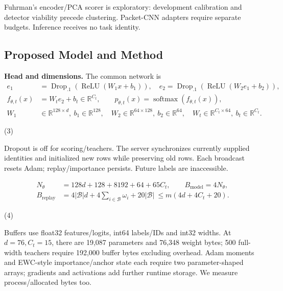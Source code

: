 \documentclass[10pt,a4paper]{article}
\begin{document}
Fuhrman's encoder/PCA scorer is exploratory: development calibration and detector viability precede clustering. Packet-CNN adapters require separate budgets. Inference receives no task identity.

\subsection{Proposed Model and Method}
\textbf{Head and dimensions.} The common network is
\begin{equation}
\begin{aligned}
e_1&=\operatorname{Drop}_{.1}(\operatorname{ReLU}(W_1x+b_1)),\quad
e_2=\operatorname{Drop}_{.1}(\operatorname{ReLU}(W_2e_1+b_2)),\\
f_{\theta,t}(x)&=W_te_2+b_t\in\mathbb R^{C_t},\qquad
p_{\theta,t}(x)=\operatorname{softmax}(f_{\theta,t}(x)),\\
W_1&\in\mathbb R^{128\times d},\ b_1\in\mathbb R^{128},\quad
W_2\in\mathbb R^{64\times128},\ b_2\in\mathbb R^{64},\quad
W_t\in\mathbb R^{C_t\times64},\ b_t\in\mathbb R^{C_t}.
\end{aligned}

\end{equation}
\par\hfill(3)\par

Dropout is off for scoring/teachers. The server synchronizes currently supplied identities and initialized new rows while preserving old rows. Each broadcast resets Adam; replay/importance persists. Future labels are inaccessible.

\begin{equation}
\begin{aligned}
N_\theta&=128d+128+8192+64+65C_t,\qquad B_{\mathrm{model}}=4N_\theta,\\
B_{\mathrm{replay}}&=4|\mathcal B|d+4\sum_{i\in\mathcal B}\omega_i+20|\mathcal B|\ \le m(4d+4C_t+20).
\end{aligned}

\end{equation}
\par\hfill(4)\par

Buffers use float32 features/logits, int64 labels/IDs and int32 widths. At $d=76,C_t=15$, there are 19,087 parameters and 76,348 weight bytes; 500 full-width teachers require 192,000 buffer bytes excluding overhead. Adam moments and EWC-style importance/anchor state each require two parameter-shaped arrays; gradients and activations add further runtime storage. We measure process/allocated bytes too.
\end{document}
